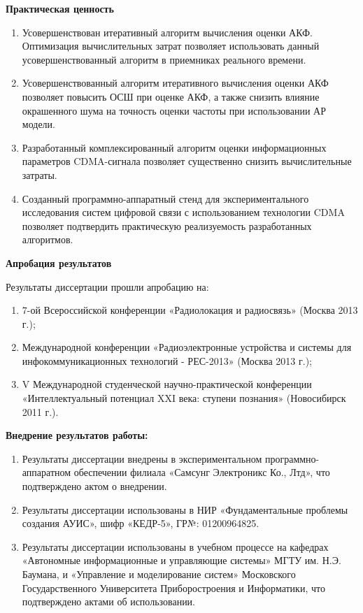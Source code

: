 {\bf{Практическая ценность}}
\begin{enumerate}
	\item {Усовершенствован итеративный алгоритм вычисления оценки АКФ. Оптимизация вычислительных затрат позволяет использовать данный усовершенствованный алгоритм
		в приемниках реального времени.}
	\item {Усовершенствованный алгоритм итеративного вычисления оценки АКФ позволяет повысить ОСШ при оценке АКФ, а также снизить влияние окрашенного шума на точность
		оценки частоты при использовании АР модели.}
	\item {Разработанный комплексированный алгоритм оценки информационных параметров CDMA-сигнала позволяет существенно снизить вычислительные затраты.}
	\item {Созданный программно-аппаратный стенд для экспериментального исследования систем цифровой связи с использованием технологии CDMA позволяет подтвердить
		практическую реализуемость разработанных алгоритмов.}
\end{enumerate}

{\bf{Апробация результатов}}

Результаты диссертации прошли апробацию на:
\begin{enumerate}
	\item {7-ой Всероссийской конференции «Радиолокация и радиосвязь» (Москва 2013 г.);}
	\item {Международной конференции «Радиоэлектронные устройства и системы для инфокоммуникационных технологий - РЕС-2013» (Москва 2013 г.);}
	\item {V Международной студенческой научно-практической конференции «Интеллектуальный потенциал XXI века: ступени познания» (Новосибирск 2011 г.).}
\end{enumerate}

{\bf{Внедрение результатов работы:}}
\begin{enumerate}
	\item {Результаты диссертации внедрены в экспериментальном программно-аппаратном обеспечении филиала «Самсунг Электроникс Ко., Лтд», что подтверждено актом о внедрении.}
	\item {Результаты диссертации использованы в НИР «Фундаментальные проблемы создания АУИС», шифр «КЕДР-5», ГР№: 01200964825.}
	\item {Результаты диссертации использованы в учебном процессе на кафедрах «Автономные информационные и управляющие системы» МГТУ им. Н.Э. Баумана, и
		«Управление и моделирование систем» Московского Государственного Университета Приборостроения и Информатики, что подтверждено актами об использовании.}
\end{enumerate}

